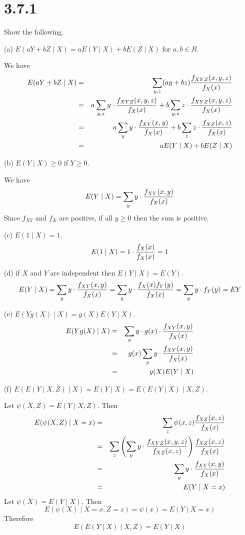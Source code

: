 \section*{3.7.1}
Show the following.

\bigskip
\noindent
(a) $E(aY+bZ\mid X)=aE(Y\mid X)+bE(Z\mid X)$ for $a,b\in R$.

\bigskip
\noindent
We have
\begin{eqnarray*}
E(aY+bZ\mid X)&=&\sum_{y,z}(ay+bz)
{f_{XYZ}(x,y,z)\over f_X(x)}\\
&=&a\sum_{y,z}y\cdot{f_{XYZ}(x,y,z)\over f_X(x)}
+b\sum_{y,z}z\cdot{f_{XYZ}(x,y,z)\over f_X(x)}\\
&=&a\sum_yy\cdot{f_{XY}(x,y)\over f_X(x)}
+b\sum_zz\cdot{f_{XZ}(x,z)\over f_X(x)}\\
&=&aE(Y\mid X)+bE(Z\mid X)
\end{eqnarray*}

\bigskip
\noindent
(b) $E(Y\mid X)\ge0$ if $Y\ge0$.

\bigskip
\noindent
We have
$$E(Y\mid X)=\sum_yy\cdot{f_{XY}(x,y)\over f_X(x)}$$
Since $f_{XY}$ and $f_X$ are positive, if all $y\ge0$ then the
sum is positive.

\bigskip
\noindent
(c) $E(1\mid X)=1$.
$$E(1\mid X)=1\cdot{f_X(x)\over f_X(x)}=1$$

\bigskip
\noindent
(d) if $X$ and $Y$ are independent then $E(Y\mid X)=E(Y)$.
$$E(Y\mid X)=\sum_yy\cdot{f_{XY}(x,y)\over f_X(x)}
=\sum_yy\cdot{f_X(x)f_Y(y)\over f_X(x)}=\sum_yy\cdot f_Y(y)=EY$$

\bigskip
\noindent
(e) $E(Yg(X)\mid X)=g(X)E(Y\mid X)$.
\begin{eqnarray*}
E(Yg(X)\mid X)&=&\sum_yy\cdot g(x)\cdot{f_{XY}(x,y)\over f_X(x)}\\
&=&g(x)\sum_yy\cdot{f_{XY}(x,y)\over f_X(x)}\\
&=&g(X)E(Y\mid X)
\end{eqnarray*}

\bigskip
\noindent
(f) $E(E(Y\mid X,Z)\mid X)=E(Y\mid X)=E(E(Y\mid X)\mid X,Z)$.

\bigskip
\noindent
Let $\psi(X,Z)=E(Y\mid X,Z)$. Then
\begin{eqnarray*}
E(\psi(X,Z)\mid X=x)&=&\sum_z\psi(x,z){f_{XZ}(x,z)\over f_X(x)}\\
&=&\sum_z\left(
\sum_yy\cdot{f_{XYZ}(x,y,z)\over f_{XZ}(x,z)}
\right)
{f_{XZ}(x,z)\over f_X(x)}\\
&=&\sum_yy\cdot{f_{XY}(x,y)\over f_X(x)}\\
&=&E(Y\mid X=x)
\end{eqnarray*}
%
Let $\psi(X)=E(Y\mid X)$. Then
$$E(\psi(X)\mid X=x,Z=z)=\psi(x)=E(Y\mid X=x)$$
Therefore
$$E(E(Y\mid X)\mid X,Z)=E(Y\mid X)$$
